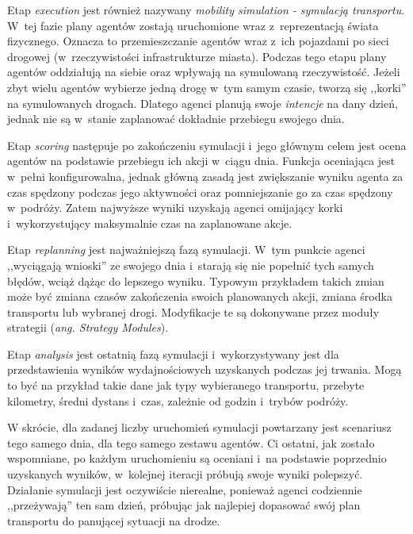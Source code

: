 \documentclass[twoside,12pt]{report}
\begin{document}
Etap \textit{execution} jest również nazywany \textit{mobility simulation - symulacją transportu}. W~tej fazie plany agentów zostają uruchomione wraz z~reprezentacją świata fizycznego. Oznacza to przemieszczanie agentów wraz z~ich pojazdami po sieci drogowej (w~rzeczywistości infrastrukturze miasta). Podczas tego etapu plany agentów oddziałują na siebie oraz wpływają na symulowaną rzeczywistość. Jeżeli zbyt wielu agentów wybierze jedną drogę w~tym samym czasie, tworzą się ,,korki'' na symulowanych drogach. Dlatego agenci planują swoje \textit{intencje} na dany dzień, jednak nie są w~stanie zaplanować dokładnie przebiegu swojego dnia.

Etap \textit{scoring} następuje po zakończeniu symulacji i~jego głównym celem jest ocena agentów na podstawie przebiegu ich akcji w~ciągu dnia. Funkcja oceniająca jest w~pełni konfigurowalna, jednak główną zasadą jest zwiększanie wyniku agenta  za czas spędzony podczas jego aktywności oraz pomniejszanie go za czas spędzony w~podróży. Zatem najwyższe wyniki uzyskają agenci omijający korki i~wykorzystujący maksymalnie czas na zaplanowane akcje.

Etap \textit{replanning} jest najważniejszą fazą symulacji. W~tym punkcie agenci ,,wyciągają wnioski'' ze swojego dnia i~starają się nie popełnić tych samych błędów, wciąż dążąc do lepszego wyniku. Typowym przykładem takich zmian może być zmiana czasów zakończenia swoich planowanych akcji, zmiana środka transportu lub wybranej drogi. Modyfikacje te są dokonywane przez moduły strategii (\textit{ang. Strategy Modules}).

Etap \textit{analysis} jest ostatnią fazą symulacji i~wykorzystywany jest dla przedstawienia wyników wydajnościowych uzyskanych podczas jej trwania. Mogą to być na przykład takie dane jak typy wybieranego transportu, przebyte kilometry, średni dystans i~czas, zależnie od godzin i~trybów podróży. 

W skrócie, dla zadanej liczby uruchomień symulacji powtarzany jest scenariusz tego samego dnia, dla tego samego zestawu agentów. Ci ostatni, jak zostało wspomniane, po każdym uruchomieniu są oceniani i~na podstawie poprzednio uzyskanych wyników, w~kolejnej iteracji próbują swoje wyniki polepszyć. Działanie symulacji jest oczywiście nierealne, ponieważ agenci codziennie ,,przeżywają'' ten sam dzień, próbując jak najlepiej dopasować swój plan transportu do panującej sytuacji na drodze.
\end{document}
